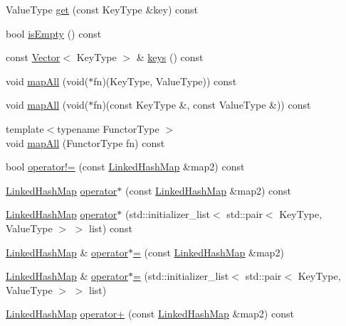 \begin{DoxyCompactItemize}
\item 
Value\+Type \mbox{\hyperlink{classLinkedHashMap_a3ac97b0a9a7fa131221427f628667ae9}{get}} (const Key\+Type \&key) const
\item 
bool \mbox{\hyperlink{classLinkedHashMap_acf82f9b2937375c7b1cf3dccb3df3312}{is\+Empty}} () const
\item 
const \mbox{\hyperlink{classVector}{Vector}}$<$ Key\+Type $>$ \& \mbox{\hyperlink{classLinkedHashMap_a556c159148b9cb5ddf91f1d41a75a78c}{keys}} () const
\item 
void \mbox{\hyperlink{classLinkedHashMap_a19f96e0d9ac469495dd46924139d697e}{map\+All}} (void($\ast$fn)(Key\+Type, Value\+Type)) const
\item 
void \mbox{\hyperlink{classLinkedHashMap_a02c631ce6ad1bdf96e585f7041ab5556}{map\+All}} (void($\ast$fn)(const Key\+Type \&, const Value\+Type \&)) const
\item 
{\footnotesize template$<$typename Functor\+Type $>$ }\\void \mbox{\hyperlink{classLinkedHashMap_a8dc32c1e45704cfae41daf8adb4e66dc}{map\+All}} (Functor\+Type fn) const
\item 
bool \mbox{\hyperlink{classLinkedHashMap_a9be7cc7d3dd06f289feea87f28b49002}{operator!=}} (const \mbox{\hyperlink{classLinkedHashMap}{Linked\+Hash\+Map}} \&map2) const
\item 
\mbox{\hyperlink{classLinkedHashMap}{Linked\+Hash\+Map}} \mbox{\hyperlink{classLinkedHashMap_a61b6a214c4265ae95067eb98e76b2009}{operator$\ast$}} (const \mbox{\hyperlink{classLinkedHashMap}{Linked\+Hash\+Map}} \&map2) const
\item 
\mbox{\hyperlink{classLinkedHashMap}{Linked\+Hash\+Map}} \mbox{\hyperlink{classLinkedHashMap_a84194e9735d5407828399ef5ed99c77e}{operator$\ast$}} (std\+::initializer\+\_\+list$<$ std\+::pair$<$ Key\+Type, Value\+Type $>$ $>$ list) const
\item 
\mbox{\hyperlink{classLinkedHashMap}{Linked\+Hash\+Map}} \& \mbox{\hyperlink{classLinkedHashMap_ae1ab3cc43d53ccab9c73548083ae0ed0}{operator$\ast$=}} (const \mbox{\hyperlink{classLinkedHashMap}{Linked\+Hash\+Map}} \&map2)
\item 
\mbox{\hyperlink{classLinkedHashMap}{Linked\+Hash\+Map}} \& \mbox{\hyperlink{classLinkedHashMap_af810d63ea278546e8c720048e718c363}{operator$\ast$=}} (std\+::initializer\+\_\+list$<$ std\+::pair$<$ Key\+Type, Value\+Type $>$ $>$ list)
\item 
\mbox{\hyperlink{classLinkedHashMap}{Linked\+Hash\+Map}} \mbox{\hyperlink{classLinkedHashMap_a6a85e7e170200435c3beb2e930ca64b2}{operator+}} (const \mbox{\hyperlink{classLinkedHashMap}{Linked\+Hash\+Map}} \&map2) const

\end{DoxyCompactItemize}
